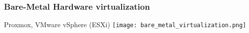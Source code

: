 \begin{frame}
\frametitle{Bare-Metal Hardware virtualization} 
    Proxmox, VMware vSphere (ESXi)
    \center\texttt{[image: bare\_metal\_virtualization.png]}
\end{frame}
